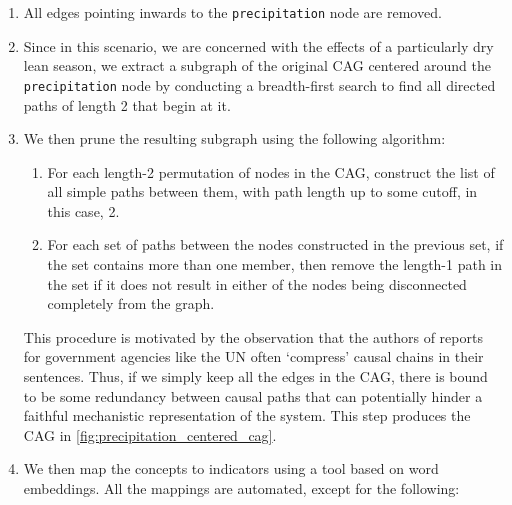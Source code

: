 \documentclass{apnotes}
\begin{document}
\begin{enumerate}
  \noindent are merged into each other.\footnote{An artifact of an outdated ontology
  mapping for CWMS in INDRA.  This will be fixed in the next version of the
corpus.} In the rest of this report, we will only show the last part of the name
of the terminal node of the ontology (i.e. after the last forward slash) for the
sake of readability, unless there is a need for disambiguation.

\item All edges pointing inwards to the \texttt{precipitation} node are removed.

\item Since in this scenario, we are concerned with the effects of a
  particularly dry lean season, we extract a subgraph of the original CAG
  centered around the \texttt{precipitation} node by conducting a
  breadth-first search to find all directed paths of length 2 that begin at it.

\item We then prune the resulting subgraph using the following algorithm:
  \begin{enumerate}
    \item For each length-2 permutation of nodes in the CAG, construct the list
      of all simple paths between them, with path length up to some cutoff, in
      this case, 2.
    \item For each set of paths between the nodes constructed in the previous
      set, if the set contains more than one member, then remove the length-1
      path in the set if it does not result in either of the nodes being
      disconnected completely from the graph.
  \end{enumerate}

  This procedure is motivated by the observation that the authors of reports 
  for government agencies like the UN often `compress' causal chains in their
  sentences. Thus, if we simply keep all the edges in the CAG, there is bound to
  be some redundancy between causal paths that can potentially hinder a faithful
  mechanistic representation of the system. This step produces the CAG in
  \autoref{fig:precipitation_centered_cag}.

\item We then map the concepts to indicators using a tool based on word
  embeddings. All the mappings are automated, except for the following:
  
  \bigskip


\end{enumerate}
\end{document}
